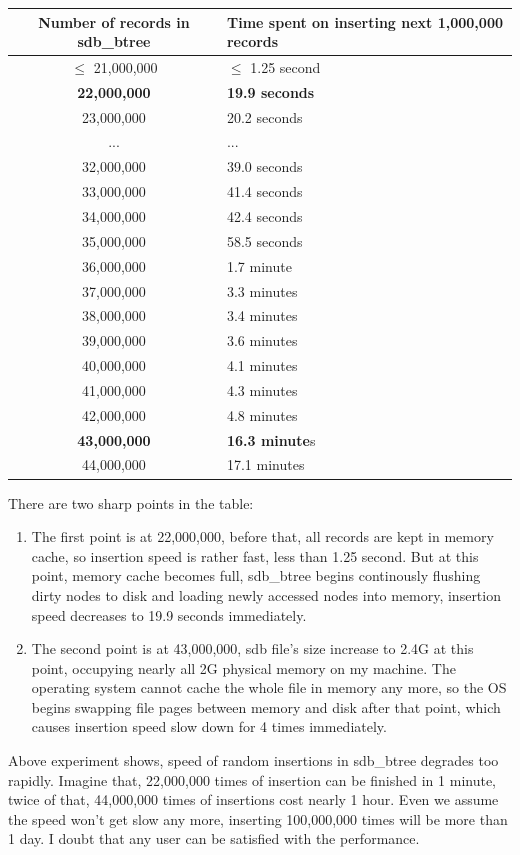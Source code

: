 \documentclass[a4paper,10pt]{article}
\begin{document}
\begin{table}[H]\centering
\begin{tabular}[t]{c|p{8cm}}
     \toprule
     Number of records in sdb\_btree & Time spent on inserting next 1,000,000 records\\
     \midrule
     $\leq$ 21,000,000 & $\leq$ 1.25 second \\
     \textbf{22,000,000} & \textbf{19.9 seconds} \\
     23,000,000 & 20.2 seconds \\
     ...        & ...  \\
     32,000,000 & 39.0 seconds\\
     33,000,000 & 41.4 seconds\\
     34,000,000 & 42.4 seconds\\
     35,000,000 & 58.5 seconds\\
     36,000,000 & 1.7 minute \\
     37,000,000 & 3.3 minutes \\
     38,000,000 & 3.4 minutes \\
     39,000,000 & 3.6 minutes \\
     40,000,000 & 4.1 minutes \\
     41,000,000 & 4.3 minutes \\
     42,000,000 & 4.8 minutes \\
     \textbf{43,000,000} & \textbf{16.3 minute}s \\
     44,000,000 & 17.1 minutes \\
     \bottomrule
\end{tabular}
\end{table}

There are two sharp points in the table:
\begin{enumerate}
\item The first point is at 22,000,000, before that, all records are kept in memory cache, so insertion speed is rather fast, less than 1.25 second.
But at this point, memory cache becomes full, sdb\_btree begins continously flushing dirty nodes to disk and loading newly accessed nodes into memory, insertion speed decreases to 19.9 seconds immediately.
\item The second point is at 43,000,000, sdb file's size increase to 2.4G at this point, occupying nearly all 2G physical memory on my machine. The operating system cannot cache the whole file in memory any more,
so the OS begins swapping file pages between memory and disk after that point, which causes insertion speed slow down for 4 times immediately.
\end{enumerate}
Above experiment shows, speed of random insertions in sdb\_btree degrades too rapidly. Imagine that, 22,000,000 times of insertion can be finished in 1 minute, twice of that, 44,000,000 times of insertions cost nearly 1 hour.
Even we assume the speed won't get slow any more, inserting 100,000,000 times will be more than 1 day. I doubt that any user can be satisfied with the performance.
\end{document}

